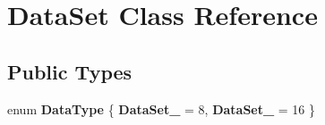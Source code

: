 \hypertarget{classDataSet}{\section{Data\+Set Class Reference}
\label{classDataSet}
}
\subsection*{Public Types}
\begin{DoxyCompactItemize}
\item 
\hypertarget{classDataSet_a7fd8108f656db008dea5cf035ddfd85e}{enum {\bfseries Data\+Type} \{ {\bfseries Data\+Set\+\_} = 8, 
{\bfseries Data\+Set\+\_} = 16
 \}}\label{classDataSet_a7fd8108f656db008dea5cf035ddfd85e}

\end{DoxyCompactItemize}
